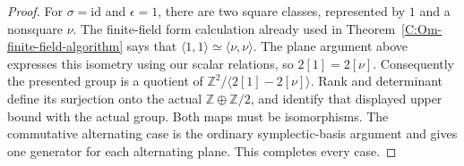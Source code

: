 \begin{proof}
For $\sigma=\mathrm{id}$ and $\epsilon=1$, there are two square
classes, represented by $1$ and a nonsquare $\nu$.
The finite-field form calculation already used in
Theorem~\ref{C:Om-finite-field-algorithm} says that
$\langle1,1\rangle\simeq\langle\nu,\nu\rangle$.
The plane argument above expresses this isometry using our scalar
relations, so $2[1]=2[\nu]$.
Consequently the presented group is a quotient of
$\mathbb Z^2/\langle2[1]-2[\nu]\rangle$.
Rank and determinant define its surjection onto the actual
$\mathbb Z\oplus\mathbb Z/2$, and identify that displayed upper
bound with the actual group. Both maps must be isomorphisms.
The commutative alternating case is the ordinary symplectic-basis
argument and gives one generator for each alternating plane.
This completes every case.
\end{proof}

